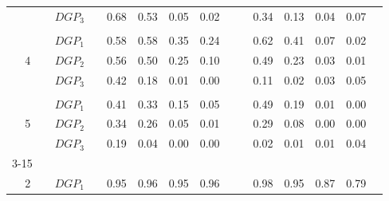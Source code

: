 \begin{table}[htbp]
{\begin{tabular}{cc|ccccccc|cccccc|}
    \multicolumn{2}{c|}{} & \multicolumn{1}{l}{$DGP_{3}$} & & \multicolumn{1}{c}{0.68} & \multicolumn{1}{c}{0.53} & \multicolumn{1}{c}{0.05} & \multicolumn{1}{c}{0.02} & & & \multicolumn{1}{c}{0.34} & \multicolumn{1}{c}{0.13} & \multicolumn{1}{c}{0.04} & \multicolumn{1}{c}{0.07} & \\
    & & & & & & & & & & & & & & \\
    \multicolumn{2}{c|}{\multirow{3}{*}{4}} & \multicolumn{1}{l}{$DGP_{1}$} & & \multicolumn{1}{c}{0.58} & \multicolumn{1}{c}{0.58} & \multicolumn{1}{c}{0.35} & \multicolumn{1}{c}{0.24} & & & \multicolumn{1}{c}{0.62} & \multicolumn{1}{c}{0.41} & \multicolumn{1}{c}{0.07} & \multicolumn{1}{c}{0.02} & \\
    \multicolumn{2}{c|}{} & \multicolumn{1}{l}{$DGP_{2}$} & & \multicolumn{1}{c}{0.56} & \multicolumn{1}{c}{0.50} & \multicolumn{1}{c}{0.25} & \multicolumn{1}{c}{0.10} & & & \multicolumn{1}{c}{0.49} & \multicolumn{1}{c}{0.23} & \multicolumn{1}{c}{0.03} & \multicolumn{1}{c}{0.01} & \\
    \multicolumn{2}{c|}{} & \multicolumn{1}{l}{$DGP_{3}$} & & \multicolumn{1}{c}{0.42} & \multicolumn{1}{c}{0.18} & \multicolumn{1}{c}{0.01} & \multicolumn{1}{c}{0.00} & & & \multicolumn{1}{c}{0.11} & \multicolumn{1}{c}{0.02} & \multicolumn{1}{c}{0.03} & \multicolumn{1}{c}{0.05} & \\
    & & & & & & & & & & & & & & \\
    \multicolumn{2}{c|}{\multirow{3}{*}{5}} & \multicolumn{1}{l}{$DGP_{1}$} & & \multicolumn{1}{c}{0.41} & \multicolumn{1}{c}{0.33} & \multicolumn{1}{c}{0.15} & \multicolumn{1}{c}{0.05} & & & \multicolumn{1}{c}{0.49} & \multicolumn{1}{c}{0.19} & \multicolumn{1}{c}{0.01} & \multicolumn{1}{c}{0.00} & \\
    \multicolumn{2}{c|}{} & \multicolumn{1}{l}{$DGP_{2}$} & & \multicolumn{1}{c}{0.34} & \multicolumn{1}{c}{0.26} & \multicolumn{1}{c}{0.05} & \multicolumn{1}{c}{0.01} & & & \multicolumn{1}{c}{0.29} & \multicolumn{1}{c}{0.08} & \multicolumn{1}{c}{0.00} & \multicolumn{1}{c}{0.00} & \\
    \multicolumn{2}{c|}{} & \multicolumn{1}{l}{$DGP_{3}$} & & \multicolumn{1}{c}{0.19} & \multicolumn{1}{c}{0.04} & \multicolumn{1}{c}{0.00} & \multicolumn{1}{c}{0.00} & & & \multicolumn{1}{c}{0.02} & \multicolumn{1}{c}{0.01} & \multicolumn{1}{c}{0.01} & \multicolumn{1}{c}{0.04} & \\
    \cmidrule{3-15}
    & & & & & & & & & & & & & & \\
    \multicolumn{2}{c|}{\multirow{3}{*}{2}} & \multicolumn{1}{l}{$DGP_{1}$} & & \multicolumn{1}{c}{0.95} & \multicolumn{1}{c}{0.96} & \multicolumn{1}{c}{0.95} & \multicolumn{1}{c}{0.96} & & & \multicolumn{1}{c}{0.98} & \multicolumn{1}{c}{0.95} & \multicolumn{1}{c}{0.87} & \multicolumn{1}{c}{0.79} & \\

\end{tabular}}
\end{table}
